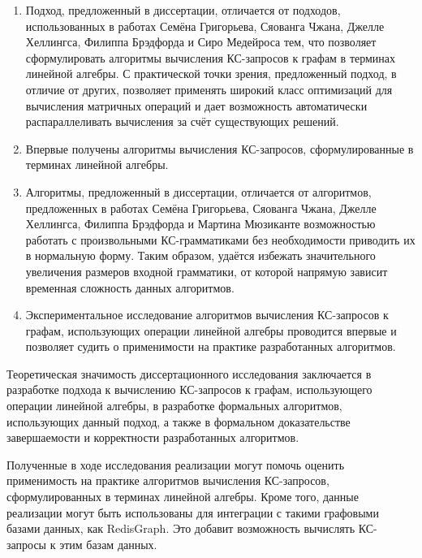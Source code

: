 {\novelty}
\begin{enumerate}[beginpenalty=10000] %
	
	\item Подход, предложенный в диссертации, отличается от подходов, использованных в работах Семёна Григорьева, Сяованга Чжана, Джелле Хеллингса, Филиппа Брэдфорда и Сиро Медейроса тем, что позволяет сформулировать алгоритмы вычисления КС-запросов к графам в терминах линейной алгебры. С практической точки зрения, предложенный подход, в отличие от других, позволяет применять широкий класс оптимизаций для вычисления матричных операций и дает возможность автоматически распараллеливать вычисления за счёт существующих решений.
	
	\item Впервые получены алгоритмы вычисления КС-запросов, сформулированные в терминах линейной алгебры.
	
	\item Алгоритмы, предложенный в диссертации, отличается от алгоритмов, предложенных в работах Семёна Григорьева, Сяованга Чжана, Джелле Хеллингса, Филиппа Брэдфорда и Мартина Мюзиканте возможностью работать с произвольными КС-грамматиками без необходимости приводить их в нормальную форму. Таким образом, удаётся избежать значительного увеличения размеров входной грамматики, от которой напрямую зависит временная сложность данных алгоритмов.
	
	\item Экспериментальное исследование алгоритмов вычисления КС-запросов к графам, использующих операции линейной алгебры проводится впервые и позволяет судить о применимости на практике разработанных алгоритмов.
	
\end{enumerate}

{\influence} 
Теоретическая значимость диссертационного исследования заключается в разработке подхода к вычислению КС-запросов к графам, использующего операции линейной алгебры, в разработке формальных алгоритмов, использующих данный подход, а также в формальном доказательстве завершаемости и корректности разработанных алгоритмов.

Полученные в ходе исследования реализации могут помочь оценить применимость на практике алгоритмов вычисления КС-запросов, сформулированных в терминах линейной алгебры. Кроме того, данные реализации могут быть использованы для интеграции с такими графовыми базами данных, как RedisGraph. Это добавит возможность вычислять КС-запросы к этим базам данных.

